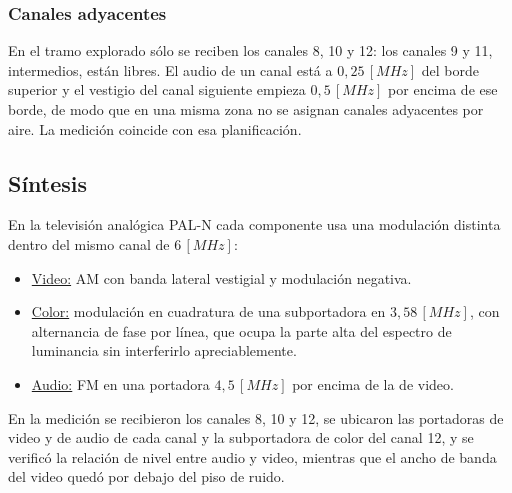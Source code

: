 \subsubsection*{Canales adyacentes}
En el tramo explorado sólo se reciben los canales 8, 10 y 12: los canales 9 y 11, intermedios, están libres. El audio de un canal está a $0{,}25 \, [MHz]$ del borde superior y el vestigio del canal siguiente empieza $0{,}5 \, [MHz]$ por encima de ese borde, de modo que en una misma zona no se asignan canales adyacentes por aire. La medición coincide con esa planificación. 

\subsection{Síntesis}
En la televisión analógica PAL-N cada componente usa una modulación distinta dentro del mismo canal de $6 \, [MHz]$:
\begin{itemize}
    \item \underline{Video:} AM con banda lateral vestigial y modulación negativa.
    \item \underline{Color:} modulación en cuadratura de una subportadora en $3{,}58 \, [MHz]$, con alternancia de fase por línea, que ocupa la parte alta del espectro de luminancia sin interferirlo apreciablemente.
    \item \underline{Audio:} FM en una portadora $4{,}5 \, [MHz]$ por encima de la de video.
\end{itemize}
En la medición se recibieron los canales 8, 10 y 12, se ubicaron las portadoras de video y de audio de cada canal y la subportadora de color del canal 12, y se verificó la relación de nivel entre audio y video, mientras que el ancho de banda del video quedó por debajo del piso de ruido.